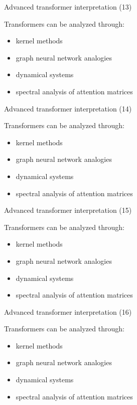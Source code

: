 \documentclass[aspectratio=169]{beamer}
\begin{document}
\begin{frame}{Advanced transformer interpretation (13)}

Transformers can be analyzed through:

\begin{itemize}
\item kernel methods
\item graph neural network analogies
\item dynamical systems
\item spectral analysis of attention matrices
\end{itemize}

\end{frame}


\begin{frame}{Advanced transformer interpretation (14)}

Transformers can be analyzed through:

\begin{itemize}
\item kernel methods
\item graph neural network analogies
\item dynamical systems
\item spectral analysis of attention matrices
\end{itemize}

\end{frame}


\begin{frame}{Advanced transformer interpretation (15)}

Transformers can be analyzed through:

\begin{itemize}
\item kernel methods
\item graph neural network analogies
\item dynamical systems
\item spectral analysis of attention matrices
\end{itemize}

\end{frame}


\begin{frame}{Advanced transformer interpretation (16)}

Transformers can be analyzed through:

\begin{itemize}
\item kernel methods
\item graph neural network analogies
\item dynamical systems
\item spectral analysis of attention matrices
\end{itemize}

\end{frame}
\end{document}
